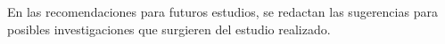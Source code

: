 %
En las recomendaciones para futuros estudios, se redactan las sugerencias para posibles investigaciones que surgieren del estudio realizado.
